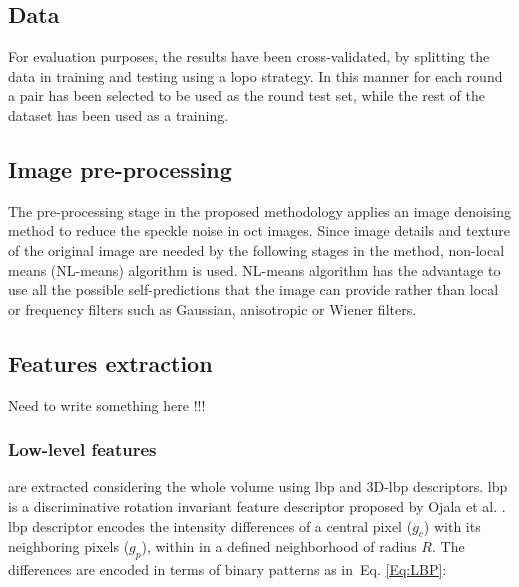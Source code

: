 \subsection{Data}
\color{red}{
\begin{itemize}
  \item cross-validation
  \item our dataset
  \item DUC dataset
\end{itemize}}\color{black}

For evaluation purposes, the results have been cross-validated, by splitting the data in training and testing using a \ac{lopo} strategy. In this manner for each round a pair \color{red}{dce,normal} has been selected to be used as the round test set, while the rest of the dataset has been used as a training. \color{black}

\color{red}{The dataset blablablabal...}\color{black}
\color{red}{The duc dataset blabla bla...}\color{black}

\subsection{Image pre-processing}
The pre-processing stage in the proposed methodology applies an image denoising method to reduce the speckle noise in \ac{oct} images. Since image details and texture of the original image are needed by the following stages in the method, non-local means (NL-means) algorithm \cite{buades2005non} is used. NL-means algorithm has the advantage to use all the possible self-predictions that the image can provide \cite{buades2005non} rather than local or frequency filters such as Gaussian, anisotropic or Wiener filters. \color{black}


\subsection{Features extraction}
Need to write something here !!!


\subsubsection{Low-level features} are extracted considering the whole volume using \ac{lbp} and 3D-\ac{lbp} descriptors. 
\ac{lbp} is a discriminative rotation invariant feature descriptor proposed by Ojala et al. \cite{ojala2002multiresolution}. 
\ac{lbp} descriptor encodes the intensity differences of a central pixel ($g_c$) with its neighboring pixels ($g_{p}$), within in a defined neighborhood of radius $R$. The differences are encoded in terms of binary patterns as in~Eq. \ref{Eq:LBP}: 

